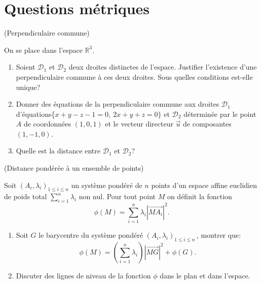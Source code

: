 \documentclass[a4paper,12pt,reqno]{amsart}
\begin{document}

\section{Questions métriques}

\begin{exo} (Perpendiculaire commune)

  On se place dans l'espace $\mathbb{R}^{3}$.
  \begin{enumerate}
    \item Soient $\mathcal{D}_{1}$ et $\mathcal{D}_{2}$ deux droites distinctes de l'espace. Justifier l'existence d'une perpendiculaire commune à ces deux droites. Sous quelles conditions est-elle unique?

    \item Donner des équations de la perpendiculaire commune aux droites $\mathcal{D}_{1}$ d'équations\newline \{$x+y-z-1=0,\ 2x+y+z=0\}$ et $\mathcal{D}_{2}$ déterminée par le point $A$ de coordonnées $(1,0,1)$ et le vecteur directeur $\overrightarrow{u}$ de composantes $(1,-1,0)$.

    \item Quelle est la distance entre $\mathcal{D}_{1}$ et $\mathcal{D}_{2}$?
  \end{enumerate}
\end{exo}

\begin{exo} (Distance pondérée à un ensemble de points)

  Soit $(A_i,\lambda_i)_{1\leq i\leq n}$ un système pondéré de $n$ points d'un espace affine euclidien de poids total $\sum_{i=1}^n \lambda_i$ non nul. Pour tout point $M$ on définit la fonction
    $$
      \phi(M)=\sum_{i=1}^n \lambda_i |\overrightarrow{MA_i}|^2.
    $$
  \begin{enumerate}
    \item Soit $G$ le barycentre du système pondéré $(A_i,\lambda_i)_{1\leq i\leq n}$\,, montrer que:
      $$
        \phi(M)=(\sum_{i=1}^n\lambda_i) |\overrightarrow{MG}|^2+\phi(G).
      $$
    \item Discuter des lignes de niveau de la fonction $\phi$ dans le plan et dans l'espace.
  \end{enumerate}
\end{exo}
\end{document}
